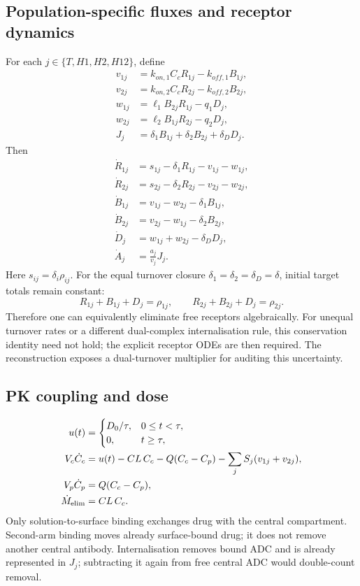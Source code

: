 \documentclass[11pt,a4paper]{article}
\begin{document}
\subsection{Population-specific fluxes and receptor dynamics}
For each $j\in\{T,H1,H2,H12\}$, define
\begin{align}
 v_{1j}&=k_{on,1}C_cR_{1j}-k_{off,1}B_{1j},\\
 v_{2j}&=k_{on,2}C_cR_{2j}-k_{off,2}B_{2j},\\
 w_{1j}&=\ell_1B_{2j}R_{1j}-q_1D_j,\\
 w_{2j}&=\ell_2B_{1j}R_{2j}-q_2D_j,\\
 J_j&=\delta_1B_{1j}+\delta_2B_{2j}+\delta_DD_j.
\end{align}
Then
\begin{align}
 \dot R_{1j}&=s_{1j}-\delta_1R_{1j}-v_{1j}-w_{1j},\\
 \dot R_{2j}&=s_{2j}-\delta_2R_{2j}-v_{2j}-w_{2j},\\
 \dot B_{1j}&=v_{1j}-w_{2j}-\delta_1B_{1j},\\
 \dot B_{2j}&=v_{2j}-w_{1j}-\delta_2B_{2j},\\
 \dot D_j&=w_{1j}+w_{2j}-\delta_DD_j,\\
 \dot A_j&=\frac{a_j}{v_j}J_j.
\end{align}
Here $s_{ij}=\delta_i\rho_{ij}$. For the equal turnover closure $\delta_1=\delta_2=\delta_D=\delta$, initial target totals remain constant:
\begin{equation}
 R_{1j}+B_{1j}+D_j=\rho_{1j},\qquad
 R_{2j}+B_{2j}+D_j=\rho_{2j}.
\end{equation}
Therefore one can equivalently eliminate free receptors algebraically. For unequal turnover rates or a different dual-complex internalisation rule, this conservation identity need not hold; the explicit receptor ODEs are then required. The reconstruction exposes a dual-turnover multiplier for auditing this uncertainty.

\subsection{PK coupling and dose}
\begin{align}
 u(t)&=\begin{cases}D_0/\tau,&0\leq t<\tau,\\0,&t\geq\tau,\end{cases}\\
 V_c\dot C_c&=u(t)-CL\,C_c-Q(C_c-C_p)-\sum_j S_j(v_{1j}+v_{2j}),\\
 V_p\dot C_p&=Q(C_c-C_p),\\
 \dot M_{\rm elim}&=CL\,C_c.
\end{align}
Only solution-to-surface binding exchanges drug with the central compartment. Second-arm binding moves already surface-bound drug; it does not remove another central antibody. Internalisation removes bound ADC and is already represented in $J_j$; subtracting it again from free central ADC would double-count removal.
\end{document}
